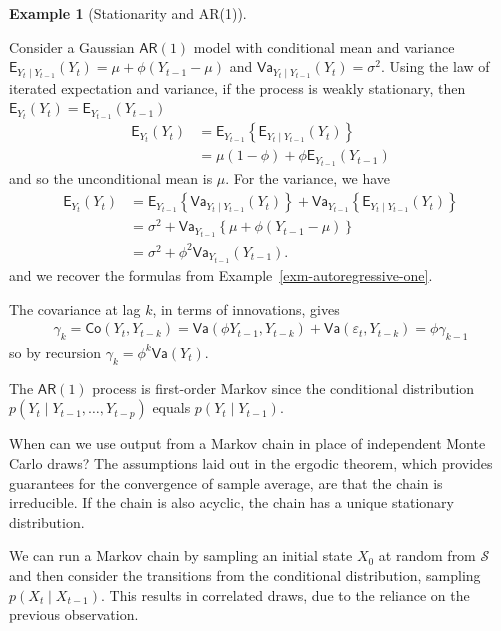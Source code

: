 \documentclass[
  11pt,
  letterpaper,
]{scrbook}
\theoremstyle{definition}
\newtheorem{example}{Example}[chapter]
\theoremstyle{plain}
\theoremstyle{plain}
\theoremstyle{plain}
\theoremstyle{definition}
\theoremstyle{definition}
\theoremstyle{plain}
\theoremstyle{plain}
\theoremstyle{remark}
\begin{document}
\begin{example}[Stationarity and
AR(1)]\protect\hypertarget{exm-ar1-stationarity}{}\label{exm-ar1-stationarity}

Consider a Gaussian \(\mathsf{AR}(1)\) model with conditional mean and
variance
\(\mathsf{E}_{Y_t \mid Y_{t-1}}(Y_t) = \mu + \phi(Y_{t-1} - \mu)\) and
\(\mathsf{Va}_{Y_t \mid Y_{t-1}}(Y_t)=\sigma^2.\) Using the law of
iterated expectation and variance, if the process is weakly stationary,
then \(\mathsf{E}_{Y_{t}}(Y_t)=\mathsf{E}_{Y_{t-1}}(Y_{t-1})\)
\begin{align*}
\mathsf{E}_{Y_{t}}(Y_t) &= \mathsf{E}_{Y_{t-1}}\left\{\mathsf{E}_{Y_{t} \mid Y_{t-1}}(Y_t)\right\}
\\&= \mu(1-\phi) + \phi\mathsf{E}_{Y_{t-1}}(Y_{t-1})
\end{align*} and so the unconditional mean is \(\mu\). For the variance,
we have \begin{align*}
\mathsf{E}_{Y_{t}}(Y_t) &= \mathsf{E}_{Y_{t-1}}\left\{\mathsf{Va}_{Y_{t} \mid Y_{t-1}}(Y_t)\right\} + \mathsf{Va}_{Y_{t-1}}\left\{\mathsf{E}_{Y_{t} \mid Y_{t-1}}(Y_t)\right\}\\
& = \sigma^2 + \mathsf{Va}_{Y_{t-1}}\left\{\mu + \phi(Y_{t-1} - \mu)\right\}
\\&= \sigma^2 + \phi^2 \mathsf{Va}_{Y_{t-1}}(Y_{t-1}).
\end{align*} and we recover the formulas from
Example~\ref{exm-autoregressive-one}.

The covariance at lag \(k\), in terms of innovations, gives
\begin{align*}
\gamma_k = \mathsf{Co}(Y_t, Y_{t-k}) = \mathsf{Va}(\phi Y_{t-1}, Y_{t-k}) + \mathsf{Va}(\varepsilon_t, Y_{t-k}) = \phi \gamma_{k-1}
\end{align*} so by recursion \(\gamma_k = \phi^k\mathsf{Va}(Y_t)\).

The \(\mathsf{AR}(1)\) process is first-order Markov since the
conditional distribution \(p(Y_t \mid Y_{t-1}, \ldots, Y_{t-p})\) equals
\(p(Y_t \mid Y_{t-1}).\)

\end{example}

When can we use output from a Markov chain in place of independent Monte
Carlo draws? The assumptions laid out in the ergodic theorem, which
provides guarantees for the convergence of sample average, are that the
chain is irreducible. If the chain is also acyclic, the chain has a
unique stationary distribution.

We can run a Markov chain by sampling an initial state \(X_0\) at random
from \(\mathcal{S}\) and then consider the transitions from the
conditional distribution, sampling \(p(X_t \mid X_{t-1}).\) This results
in correlated draws, due to the reliance on the previous observation.
\end{document}
